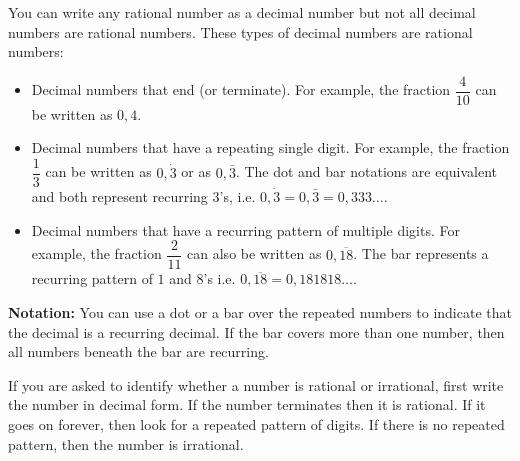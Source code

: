 
You can write any rational number as a decimal number but not all
decimal numbers are rational numbers. These types of decimal
numbers are rational numbers:\par 
\begin{itemize}
\item Decimal numbers that end (or terminate). For example, the fraction $\dfrac{4}{10}$ can be written as $0,4$.
\item Decimal numbers that have a repeating single digit. For example, the fraction $\dfrac{1}{3}$ can be written as 
$0,\dot{3}$ or as $0,\bar{3}$. 
The dot and bar notations are equivalent and both represent recurring $3$'s, i.e.
$0,\dot{3} = 0,\bar{3} = 0,333\ldots$.
\item Decimal numbers that have a recurring pattern of multiple digits. For example, the fraction $\dfrac{2}{11}$ can also be written as 
$0,\overline{18}$. 
The bar represents a recurring pattern of $1$ and $8$'s i.e.
$0,\overline{18} = 0,181818\ldots$.
\end{itemize}

\par
\textbf{Notation:} You can use a dot or a bar over the repeated numbers to indicate that the decimal is a recurring decimal. If the bar covers more than one number, then all numbers beneath the bar are recurring.

\par
If you are asked to identify whether a number is rational or
irrational, first write the number in decimal form. If the number
terminates then it is rational. If it goes on forever, then look for a
repeated pattern of digits. If there is no repeated pattern, then the
number is irrational.
 
